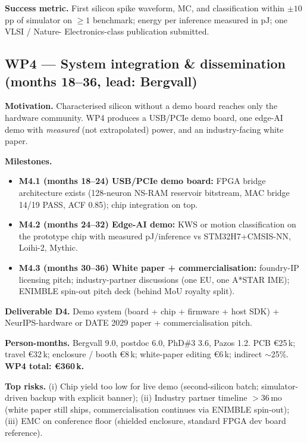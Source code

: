 \textbf{Success metric.} First silicon spike waveform, MC, and
classification within $\pm 10$\,pp of simulator on $\geq\!1$
benchmark; energy per inference measured in pJ; one VLSI / Nature-
Electronics-class publication submitted.

\subsection{WP4 --- System integration \& dissemination (months 18--36,
lead: Bergvall)}

\textbf{Motivation.} Characterised silicon without a demo board reaches
only the hardware community. WP4 produces a USB/PCIe demo board, one
edge-AI demo with \emph{measured} (not extrapolated) power, and an
industry-facing white paper.

\textbf{Milestones.}
\begin{itemize}[leftmargin=1.4em, topsep=2pt, itemsep=1pt]
\item \textbf{M4.1 (months 18--24) USB/PCIe demo board:} FPGA bridge
architecture exists (128-neuron NS-RAM reservoir bitstream, MAC bridge
14/19 PASS, ACF 0.85); chip integration on top.
\item \textbf{M4.2 (months 24--32) Edge-AI demo:} KWS or motion
classification on the prototype chip with measured pJ/inference vs
STM32H7+CMSIS-NN, Loihi-2, Mythic.
\item \textbf{M4.3 (months 30--36) White paper + commercialisation:}
foundry-IP licensing pitch; industry-partner discussions (one EU, one
A*STAR IME); ENIMBLE spin-out pitch deck (behind MoU royalty split).
\end{itemize}

\textbf{Deliverable D4.} Demo system (board + chip + firmware + host
SDK) + NeurIPS-hardware or DATE 2029 paper + commercialisation pitch.

\textbf{Person-months.} Bergvall 9.0, postdoc 6.0, PhD\#3 3.6, Pazos
1.2. PCB \euro 25\,k; travel \euro 32\,k; enclosure / booth \euro 8\,k;
white-paper editing \euro 6\,k; indirect $\sim$25\%.
\textbf{WP4 total: \euro 360\,k.}

\textbf{Top risks.} (i) Chip yield too low for live demo (second-silicon
batch; simulator-driven backup with explicit banner); (ii) Industry
partner timeline $>$36\,mo (white paper still ships, commercialisation
continues via ENIMBLE spin-out); (iii) EMC on conference floor (shielded
enclosure, standard FPGA dev board reference).

